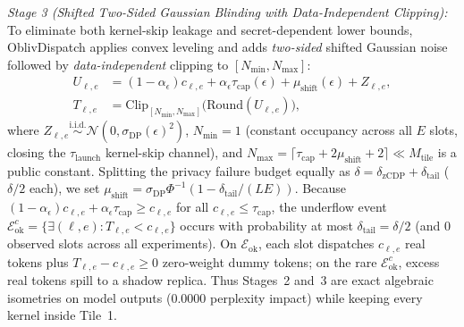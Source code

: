 \documentclass[final,5p,times,twocolumn]{elsarticle}
\def\OD{OblivDispatch}%
\theoremstyle{definition}
\theoremstyle{remark}
\newcommand{\OD}{\textsc{OblivDispatch}}
\begin{document}
\emph{Stage 3 (Shifted Two-Sided Gaussian Blinding with Data-Independent Clipping):} To eliminate both kernel-skip leakage and secret-dependent lower bounds, \OD{} applies convex leveling and adds \emph{two-sided} shifted Gaussian noise followed by \emph{data-independent} clipping to $[N_{\min}, N_{\max}]$:
\begin{align}\label{eq:dp_pad}
  U_{\ell, e} &= (1 - \alpha_\epsilon) c_{\ell, e} + \alpha_\epsilon \tau_{\mathrm{cap}}(\epsilon) + \mu_{\mathrm{shift}}(\epsilon) + Z_{\ell, e}, \nonumber\\
  T_{\ell, e} &= \mathrm{Clip}_{[N_{\min}, N_{\max}]}\!\big(\mathrm{Round}(U_{\ell, e})\big),
\end{align}
where $Z_{\ell, e} \stackrel{\mathrm{i.i.d.}}{\sim} \mathcal{N}(0, \sigma_{\mathrm{DP}}(\epsilon)^2)$, $N_{\min} = 1$ (constant occupancy across all $E$ slots, closing the $\tau_{\mathrm{launch}}$ kernel-skip channel), and $N_{\max} = \lceil \tau_{\mathrm{cap}} + 2\mu_{\mathrm{shift}} + 2 \rceil \ll M_{\mathrm{tile}}$ is a public constant. Splitting the privacy failure budget equally as $\delta = \delta_{\mathrm{zCDP}} + \delta_{\mathrm{tail}}$ ($\delta/2$ each), we set $\mu_{\mathrm{shift}} = \sigma_{\mathrm{DP}} \Phi^{-1}(1 - \delta_{\mathrm{tail}}/(LE))$. Because $(1-\alpha_\epsilon)c_{\ell,e} + \alpha_\epsilon\tau_{\mathrm{cap}} \ge c_{\ell,e}$ for all $c_{\ell,e} \le \tau_{\mathrm{cap}}$, the underflow event $\mathcal{E}_{\mathrm{ok}}^c = \{\exists (\ell, e) : T_{\ell, e} < c_{\ell, e}\}$ occurs with probability at most $\delta_{\mathrm{tail}} = \delta/2$ (and $0$ observed slots across all experiments). On $\mathcal{E}_{\mathrm{ok}}$, each slot dispatches $c_{\ell, e}$ real tokens plus $T_{\ell, e} - c_{\ell, e} \ge 0$ zero-weight dummy tokens; on the rare $\mathcal{E}_{\mathrm{ok}}^c$, excess real tokens spill to a shadow replica. Thus Stages~2 and~3 are exact algebraic isometries on model outputs ($0.0000$ perplexity impact) while keeping every kernel inside Tile~1.
\end{document}
